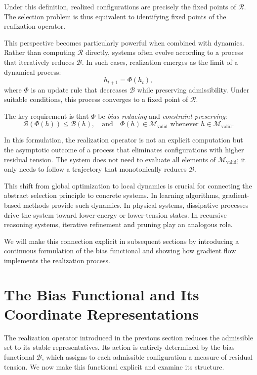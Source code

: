 \documentclass[11pt]{article}
\theoremstyle{plain}
\theoremstyle{definition}
\theoremstyle{remark}
\begin{document}
Under this definition, realized configurations are precisely the fixed points of $\mathcal{R}$. The selection problem is thus equivalent to identifying fixed points of the realization operator.

This perspective becomes particularly powerful when combined with dynamics. Rather than computing $\mathcal{R}$ directly, systems often evolve according to a process that iteratively reduces $\mathcal{B}$. In such cases, realization emerges as the limit of a dynamical process:
\[
h_{t+1} = \Phi(h_t),
\]
where $\Phi$ is an update rule that decreases $\mathcal{B}$ while preserving admissibility. Under suitable conditions, this process converges to a fixed point of $\mathcal{R}$.

The key requirement is that $\Phi$ be \emph{bias-reducing} and \emph{constraint-preserving}:
\[
\mathcal{B}(\Phi(h)) \leq \mathcal{B}(h), \quad \text{and} \quad \Phi(h) \in \mathcal{M}_{\mathrm{valid}} \text{ whenever } h \in \mathcal{M}_{\mathrm{valid}}.
\]

In this formulation, the realization operator is not an explicit computation but the asymptotic outcome of a process that eliminates configurations with higher residual tension. The system does not need to evaluate all elements of $\mathcal{M}_{\mathrm{valid}}$; it only needs to follow a trajectory that monotonically reduces $\mathcal{B}$.

This shift from global optimization to local dynamics is crucial for connecting the abstract selection principle to concrete systems. In learning algorithms, gradient-based methods provide such dynamics. In physical systems, dissipative processes drive the system toward lower-energy or lower-tension states. In recursive reasoning systems, iterative refinement and pruning play an analogous role.

We will make this connection explicit in subsequent sections by introducing a continuous formulation of the bias functional and showing how gradient flow implements the realization process.

\section{The Bias Functional and Its Coordinate Representations}

The realization operator introduced in the previous section reduces the admissible set to its stable representatives. Its action is entirely determined by the bias functional $\mathcal{B}$, which assigns to each admissible configuration a measure of residual tension. We now make this functional explicit and examine its structure.
\end{document}
